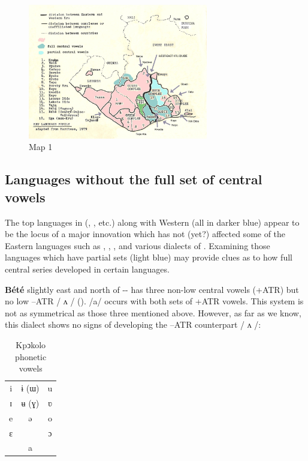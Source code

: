 \documentclass[output=paper
,newtxmath
,modfonts
,nonflat]{langsci/langscibook}
\begin{document}
\begin{figure}
\includegraphics[width=0.7\textwidth]{figures/fig-zogbo-1.png}
\caption*{Map 1}
\end{figure} 

\subsection{Languages without the full set of central vowels}\label{sec:zogbo:2.2} 

The top languages in  (,  , etc.) along with Western  (all in darker blue) appear to be the locus of a major innovation which has not (yet?) affected some of the Eastern languages such as , , , and various dialects of . Examining those languages which have partial sets (light blue) may provide clues as to how full central series developed in certain languages. 

\textbf{ Bété} slightly east and north of -- has three non-low central vowels (+ATR) but no low –ATR / ʌ / (\citealt{Zogbo2005}). /a/ occurs with both sets of +ATR vowels. This system is not as symmetrical as those three mentioned above. However, as far as we know, this dialect shows no signs of developing the –ATR counterpart / ʌ /: 

\begin{table}
\begin{tabular}{ccc}
i  &  ɨ (ɯ) &   u\\

ɪ  &  ʉ (ɣ)  &  ʋ\\

e  &  ə  &  o\\

ɛ  &   &   ɔ\\

&a&\\
\end{tabular}
\caption{Kpↄkolo phonetic vowels}
\label{tab:zogbo:11}
\end{table}
\end{document}
